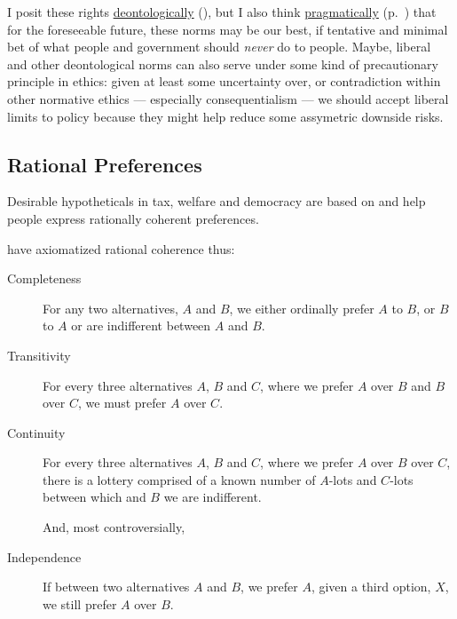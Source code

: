 I posit these rights \hyperref[itm:deontological]{deontologically} (), but I also think \hyperref[itm:pragmatic-ethics]{pragmatically} (p.~\pageref{itm:pragmatic-ethics}) that for the foreseeable future, these norms may be our best, if tentative and minimal bet of what people and government should \emph{never} do to people.
Maybe, liberal and other deontological norms can also serve under some kind of precautionary principle in ethics:
given at least some uncertainty over, or contradiction within other normative ethics --- especially consequentialism --- we should accept liberal limits to policy because they might help reduce some assymetric downside risks.

\subsection[Rational]{Rational Preferences}
	\label{sec:rational}
Desirable hypotheticals in tax, welfare and democracy are based on and help people express rationally coherent preferences.

\cite{VonNeumannMorgenstern1944} have axiomatized rational coherence thus:
\begin{description}
	\item[Completeness]
		\label{itm:completeness}
	For any two alternatives, $A$ and $B$, we either ordinally prefer $A$ to $B$, or $B$ to $A$ or are indifferent between $A$ and $B$.

	\item[Transitivity]
		\label{itm:transitivity}
	For every three alternatives $A$, $B$ and $C$, where we prefer $A$ over $B$ and $B$ over $C$, we must prefer $A$ over $C$.

	\item[Continuity]
		\label{itm:continuity}
	For every three alternatives	$A$, $B$ and $C$, where we prefer $A$ over $B$ over $C$, there is a lottery comprised of a known number of $A$-lots and $C$-lots between which and $B$ we are indifferent.

	And, most controversially,

	\item[Independence]
		\label{itm:independence}
	If between two alternatives $A$ and $B$, we prefer $A$, given a third option, $X$, we still prefer $A$ over $B$.
\end{description}

